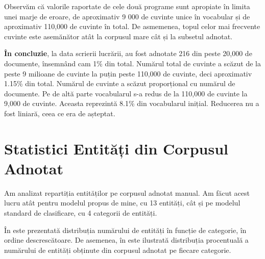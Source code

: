 \lstset{language=make}
\lstset{caption=Cele mai folosite cuvinte din limba engleză pentru subsetul adnotat din corpus obținut folosind Java, label=lst:top-words-java-annotated}


Observăm că valorile raportate de cele două programe sunt apropiate în limita unei marje de eroare, de aproximativ 9 000 de cuvinte unice în vocabular și de aproximativ 110,000 de cuvinte în total. De asmemenea, topul celor mai frecvente cuvinte este asemănător atât la corpusul mare cât și la subsetul adnotat.

\textbf{În concluzie}, la data scrierii lucrării, au fost adnotate 216 din peste 20,000 de documente, însemnând cam 1\% din total. Numărul total de cuvinte a scăzut de la peste 9 milioane de cuvinte la puțin peste 110,000 de cuvinte, deci aproximativ 1.15\% din total. Numărul de cuvinte a scăzut proporțional cu numărul de documente. Pe de altă parte vocabularul s-a redus de la 110,000 de cuvinte la 9,000 de cuvinte. Aceasta reprezintă 8.1\% din vocabularul inițial. Reducerea nu a fost liniară, ceea ce era de așteptat.

\section{Statistici Entități din Corpusul Adnotat}

Am analizat repartiția entităților pe corpusul adnotat manual. Am făcut acest lucru atât pentru modelul propus de mine, cu 13 entități, cât și pe modelul standard de clasificare, cu 4 categorii de entități.

În  este prezentată distribuția numărului de entități în funcție de categorie, în ordine descrescătoare. De asemenea, în  este ilustrată distribuția procentuală a numărului de entități obținute din corpusul adnotat pe fiecare categorie.


